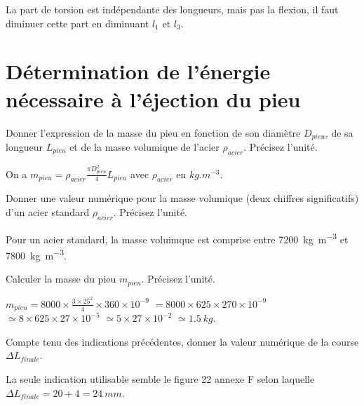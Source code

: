 \documentclass[11pt]{article}
\begin{document}
\begin{UPSTIcorrige}
La part de torsion est indépendante des longueurs, mais pas la flexion, il faut diminuer cette part en diminuant $l_1$ et $l_3$.
\end{UPSTIcorrige}


\section{Détermination de l'énergie nécessaire à l'éjection du pieu}

\UPSTIquestion* Donner l'expression de la masse du pieu en fonction de son diamètre $D_{pieu}$, de sa longueur $L_{pieu}$ et de la masse volumique de l'acier $\rho_{acier}$. Précisez l'unité. 

\begin{UPSTIcorrige}
On a  $m_{pieu} = \rho_{acier} \frac{\pi D^2_{pieu}}{4} L_{pieu}$ avec $\rho_{acier}$ en $\si{kg.m^{-3}}$. 
\end{UPSTIcorrige}

\UPSTIquestion Donner une valeur numérique pour la masse volumique (deux chiffres significatifs) d'un acier standard $\rho_{acier}$. Précisez l'unité. 

\begin{UPSTIcorrige}
Pour un acier standard, la masse voluimque est comprise entre \SI{7200}{kg.m^{-3}} et \SI{7800}{kg.m^{-3}}.
\end{UPSTIcorrige}

\UPSTIquestion Calculer la masse du pieu $m_{pieu}$. Précisez l'unité. 

\begin{UPSTIcorrige}
$m_{pieu} = 8000 \times \frac{3\times 25^2}{4} \times 360 \times 10^{-9}$
$= 8000 \times 625\times 270 \times 10^{-9}$
$\simeq 8 \times625\times 27 \times 10^{-5}$
$\simeq 5\times 27 \times 10^{-2}$
$\simeq \SI{1,5}{kg}$.


\end{UPSTIcorrige}


\UPSTIquestion Compte tenu des indications précédentes, donner la valeur numérique de la course $\Delta L_{finale}$. 

\begin{UPSTIcorrige}

La seule indication utilisable semble le figure 22 annexe F selon laquelle  $\Delta L_{finale} = 20 + 4 = \SI{24}{mm}$.

\end{UPSTIcorrige}
\end{document}
